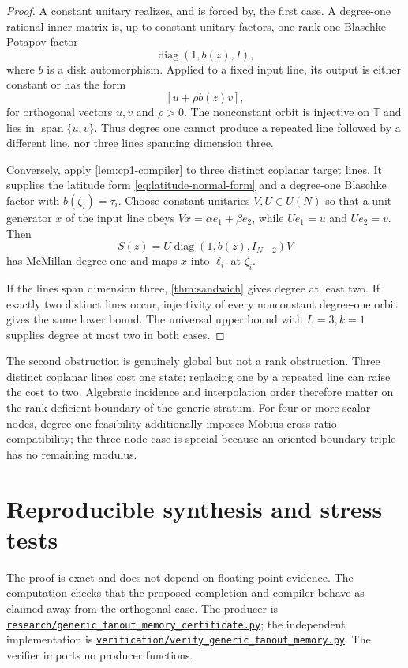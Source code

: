 \documentclass[11pt]{article}
\theoremstyle{definition}
\theoremstyle{remark}
\newcommand{\T}{\mathbb T}
\newcommand{\diag}{\operatorname{diag}}
\newcommand{\Span}{\operatorname{span}}
\begin{document}
\begin{proof}
A constant unitary realizes, and is forced by, the first case.  A degree-one
rational-inner matrix is, up to constant unitary factors, one rank-one
Blaschke--Potapov factor
\[
                     \diag(1,b(z),I),
\]
where $b$ is a disk automorphism.  Applied to a fixed input line, its output
is either constant or has the form
\begin{equation}\label{eq:potapov-orbit}
                        [u+\rho b(z)v],
\end{equation}
for orthogonal vectors $u,v$ and $\rho>0$.  The nonconstant orbit is
injective on $\T$ and lies in $\Span\{u,v\}$.  Thus degree one cannot produce
a repeated line followed by a different line, nor three lines spanning
dimension three.

Conversely, apply \cref{lem:cp1-compiler} to three distinct coplanar target
lines.  It supplies the latitude form \eqref{eq:latitude-normal-form} and a
degree-one Blaschke factor with $b(\zeta_i)=\tau_i$.  Choose constant
unitaries $V,U\in U(N)$ so that a unit generator $x$ of the input line obeys
$Vx=\alpha e_1+\beta e_2$, while $Ue_1=u$ and $Ue_2=v$.  Then
\[
             S(z)=U\diag(1,b(z),I_{N-2})V
\]
has McMillan degree one and maps $x$ into $\ell_i$ at $\zeta_i$.

If the lines span dimension three, \cref{thm:sandwich} gives degree at least
two.  If exactly two distinct lines occur, injectivity of every nonconstant
degree-one orbit gives the same lower bound.  The universal upper bound with
$L=3,k=1$ supplies degree at most two in both cases.
\end{proof}

The second obstruction is genuinely global but not a rank obstruction.
Three distinct coplanar lines cost one state; replacing one by a repeated
line can raise the cost to two.  Algebraic incidence and interpolation order
therefore matter on the rank-deficient boundary of the generic stratum.
For four or more scalar nodes, degree-one feasibility additionally imposes
Möbius cross-ratio compatibility; the three-node case is special because an
oriented boundary triple has no remaining modulus.

\section{Reproducible synthesis and stress tests}\label{sec:computation}

The proof is exact and does not depend on floating-point evidence.  The
computation checks that the proposed completion and compiler behave as
claimed away from the orthogonal case.  The producer is
\href{https://github.com/lluiseriksson/finite-sample-spectral-certificates/blob/research/generic-fanout-memory/research/generic_fanout_memory_certificate.py}{\texttt{research/generic\_fanout\_memory\_certificate.py}};
the independent implementation is
\href{https://github.com/lluiseriksson/finite-sample-spectral-certificates/blob/research/generic-fanout-memory/verification/verify_generic_fanout_memory.py}{\texttt{verification/verify\_generic\_fanout\_memory.py}}.
The verifier imports no producer functions.
\end{document}
